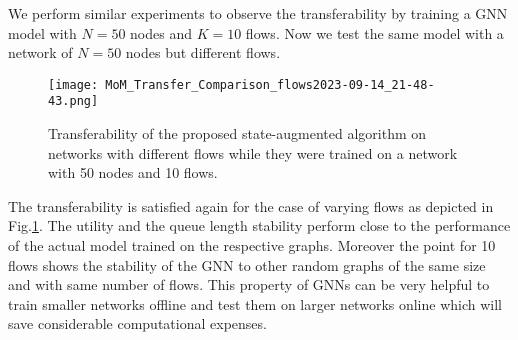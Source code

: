 \documentclass[lettersize,journal]{IEEEtran}
\begin{document}
We perform similar experiments to observe the transferability by training a GNN model with $N=50$ nodes and $K=10$ flows. Now we test the same model with a network of $N=50$ nodes but different flows.
\begin{figure}[h]%
    \centering   
    \texttt{[image: MoM\_Transfer\_Comparison\_flows2023-09-14\_21-48-43.png]}
    \caption{Transferability of the proposed state-augmented algorithm on networks with different flows while they were trained on a network with 50 nodes and 10 flows.}
    \label{Fig:transfer_flows}
\end{figure}
The transferability is satisfied again for the case of varying flows as depicted in Fig.\ref{Fig:transfer_flows}. The utility and the queue length stability perform close to the performance of the actual model trained on the respective graphs. Moreover the point for 10 flows shows the stability of the GNN to other random graphs of the same size and with same number of flows. This property of GNNs can be very helpful to train smaller networks offline and test them on larger networks online which will save considerable computational expenses.
\end{document}
